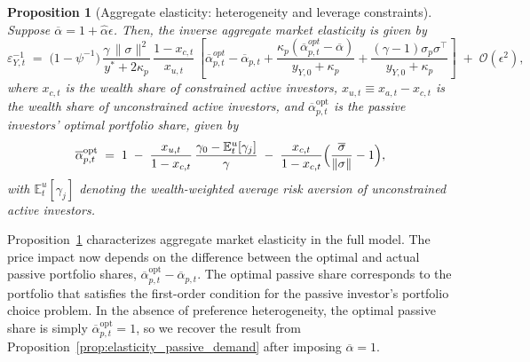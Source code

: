 \documentclass[12pt,english]{article}
\newtheorem{prop}{Proposition}
\begin{document}
\begin{prop}[Aggregate elasticity: heterogeneity and leverage constraints]\label{prop_elasticity_pref_heterog}
Suppose $\overline{\alpha} = 1 + \hat{\alpha}\epsilon$.
Then, the inverse aggregate market elasticity is given by
\begin{equation}\label{eq:elasticity_pref_heterog}
    \varepsilon_{Y,t}^{-1}
    \;=\;
    \bigl(1-\psi^{-1}\bigr)\,
    \frac{\gamma\,\|\sigma\|^{2}}{y^{*}+2 \kappa_p}\,
    \frac{1-x_{c,t}}{x_{u,t}}\,
    \left[ \overline{\alpha}_{p,t}^{opt}- \overline{\alpha}_{p,t}+\frac{\kappa_p(\overline{\alpha}_{p,t}^{opt}-\overline{\alpha})}{y_{Y,0}+\kappa_p}  +\frac{(\gamma-1) \sigma_p \sigma^\top}{y_{Y,0}+\kappa_p} \right]
    \;+\;\mathcal{O}\!\left(\epsilon^{2}\right),
\end{equation}
where $x_{c,t}$ is the wealth share of constrained active investors,
$x_{u,t}\equiv x_{a,t}-x_{c,t}$ is the wealth share of unconstrained active investors, 
 and $\overline{\alpha}_{p,t}^{\mathrm{opt}}$ is the passive investors’ optimal portfolio share, given by
\begin{equation}\label{eq:optimal_alpha_p}
    \overline{\alpha}_{p,t}^{\mathrm{opt}}
    \;=\;
    1
    \;-\;
    \frac{x_{u,t}}{1-x_{c,t}}\,
    \frac{\gamma_{0}-\mathbb{E}^{u}_{t}[\gamma_{j}]}{\gamma}
    \;-\;
    \frac{x_{c,t}}{1-x_{c,t}}
    \Bigl(\frac{\overline{\sigma}}{\|\sigma\|}-1\Bigr),
\end{equation}
with $\mathbb{E}^{u}_{t}[\gamma_{j}]$ denoting the wealth-weighted average risk aversion of unconstrained active investors.
\end{prop}

Proposition~\ref{prop_elasticity_pref_heterog} characterizes aggregate market elasticity in the full model.
The price impact now depends on the difference between the optimal and actual passive portfolio shares, $\overline{\alpha}_{p,t}^{\mathrm{opt}}-\overline{\alpha}_{p,t}$.
The optimal passive share corresponds to the portfolio that satisfies the first-order condition for the passive investor's portfolio choice problem.
In the absence of preference heterogeneity, the optimal passive share is simply $\overline{\alpha}_{p,t}^{\mathrm{opt}}=1$, so we recover the result from Proposition~\ref{prop:elasticity_passive_demand} after imposing $\overline{\alpha}=1$.
\end{document}
